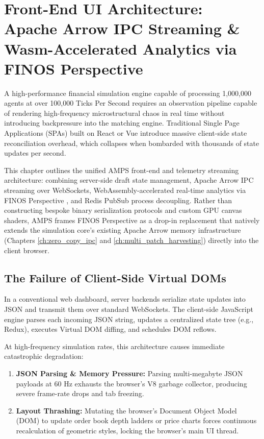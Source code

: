 \chapter{Front-End UI Architecture: Apache Arrow IPC Streaming \& Wasm-Accelerated Analytics via FINOS Perspective}
\label{ch:frontend_streaming}

A high-performance financial simulation engine capable of processing 1,000,000 agents at over 100,000 Ticks Per Second requires an observation pipeline capable of rendering high-frequency microstructural chaos in real time without introducing backpressure into the matching engine. Traditional Single Page Applications (SPAs) built on React or Vue introduce massive client-side state reconciliation overhead, which collapses when bombarded with thousands of state updates per second. 

This chapter outlines the unified AMPS front-end and telemetry streaming architecture: combining server-side draft state management, Apache Arrow IPC streaming over WebSockets, WebAssembly-accelerated real-time analytics via FINOS Perspective \cite{finos_perspective}, and Redis PubSub process decoupling. Rather than constructing bespoke binary serialization protocols and custom GPU canvas shaders, AMPS frames FINOS Perspective as a drop-in replacement that natively extends the simulation core's existing Apache Arrow memory infrastructure (Chapters \ref{ch:zero_copy_ipc} and \ref{ch:multi_patch_harvesting}) directly into the client browser.

\section{The Failure of Client-Side Virtual DOMs}

In a conventional web dashboard, server backends serialize state updates into JSON and transmit them over standard WebSockets. The client-side JavaScript engine parses each incoming JSON string, updates a centralized state tree (e.g., Redux), executes Virtual DOM diffing, and schedules DOM reflows.

At high-frequency simulation rates, this architecture causes immediate catastrophic degradation:
\begin{enumerate}
    \item \textbf{JSON Parsing \& Memory Pressure:} Parsing multi-megabyte JSON payloads at 60 Hz exhausts the browser's V8 garbage collector, producing severe frame-rate drops and tab freezing.
    \item \textbf{Layout Thrashing:} Mutating the browser's Document Object Model (DOM) to update order book depth ladders or price charts forces continuous recalculation of geometric styles, locking the browser's main UI thread.
\end{enumerate}

